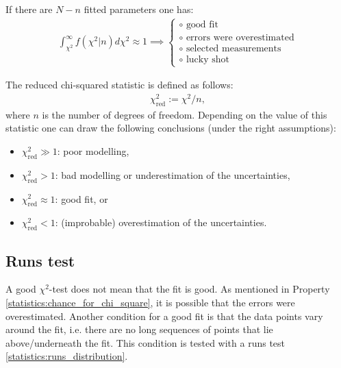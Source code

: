 {    \begin{property}\label{statistics:chance_for_chi_square}
        If there are $N - n$ fitted parameters one has:
        \begin{gather}
            \int_{\chi^2}^\infty f\left(\chi^2|n\right)d\chi^2 \approx 1\implies
            \begin{cases}
                \circ\text{ good fit}\\
                \circ\text{ errors were overestimated}\\
                \circ\text{ selected measurements}\\
                \circ\text{ lucky shot}
            \end{cases}
        \end{gather}
    \end{property}
    \begin{property}
        The reduced chi-squared statistic is defined as follows:
        \begin{gather}
            \chi^2_\mathrm{red} := \chi^2/n,
        \end{gather}
        where $n$ is the number of degrees of freedom. Depending on the value of this statistic one can draw the following conclusions (under the right assumptions):
        \begin{itemize}
            \item $\chi^2_\mathrm{red} \gg 1$: poor modelling,
            \item $\chi^2_\mathrm{red} > 1$: bad modelling or underestimation of the uncertainties,
            \item $\chi^2_\mathrm{red} \approx 1$: good fit, or
            \item $\chi^2_\mathrm{red} < 1$: (improbable) overestimation of the uncertainties.
        \end{itemize}
    \end{property}

\subsection{Runs test}

    A good $\chi^2$-test does not mean that the fit is good. As mentioned in Property \ref{statistics:chance_for_chi_square}, it is possible that the errors were overestimated. Another condition for a good fit is that the data points vary around the fit, i.e. there are no long sequences of points that lie above/underneath the fit. This condition is tested with a runs test \ref{statistics:runs_distribution}.

}

